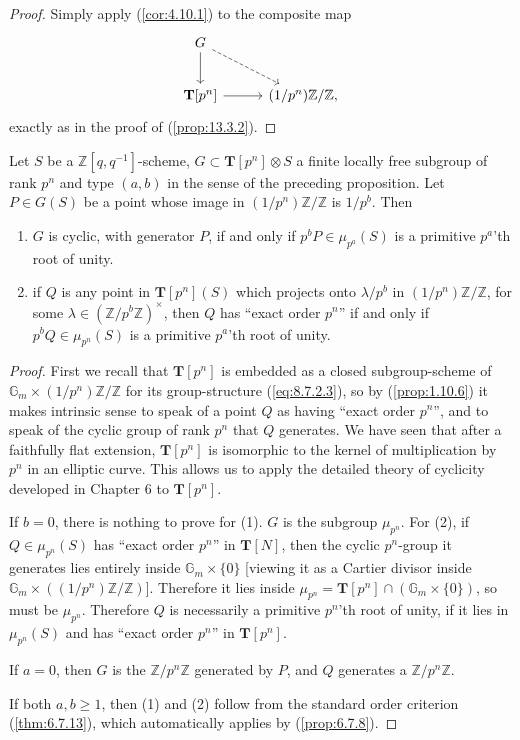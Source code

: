 \begin{proof}
Simply apply (\ref{cor:4.10.1}) to the composite map
\[
\begin{tikzcd}[row sep=2.3em, column sep=2.8em]
G \arrow[d] \arrow[rd, dashed] & \\
\mathbf{T}[p^n] \arrow[r] & (1/p^n)\mathbb{Z}/\mathbb{Z} ,
\end{tikzcd}
\]
exactly as in the proof of (\ref{prop:13.3.2}).
\end{proof}

\begin{kprop}\label{prop:13.6.3}
Let $S$ be a $\mathbb{Z}[q,q^{-1}]$-scheme, $G \subset \mathbf{T}[p^n] \otimes S$ a finite locally free subgroup of rank $p^n$ and type $(a,b)$ in the sense of the preceding proposition. Let $P \in G(S)$ be a point whose image in $(1/p^n)\mathbb{Z}/\mathbb{Z}$ is $1/p^b$. Then
\begin{enumerate}[label=(\arabic*), leftmargin=2.4em]
\item $G$ is cyclic, with generator $P$, if and only if $p^b P \in \mu_{p^a}(S)$ is a primitive $p^a$'th root of unity.
\item if $Q$ is any point in $\mathbf{T}[p^n](S)$ which projects onto $\lambda/p^b$ in $(1/p^n)\mathbb{Z}/\mathbb{Z}$, for some $\lambda \in (\mathbb{Z}/p^b\mathbb{Z})^\times$, then $Q$ has ``exact order $p^n$'' if and only if $p^b Q \in \mu_{p^n}(S)$ is a primitive $p^a$'th root of unity.
\end{enumerate}
\end{kprop}

\begin{proof}
First we recall that $\mathbf{T}[p^n]$ is embedded as a closed subgroup-scheme of $\mathbb{G}_m \times (1/p^n)\mathbb{Z}/\mathbb{Z}$ for its group-structure (\ref{eq:8.7.2.3}), so by (\ref{prop:1.10.6}) it makes intrinsic sense to speak of a point $Q$ as having ``exact order $p^n$'', and to speak of the cyclic group of rank $p^n$ that $Q$ generates. We have seen that after a faithfully flat extension, $\mathbf{T}[p^n]$ is isomorphic to the kernel of multiplication by $p^n$ in an elliptic curve. This allows us to apply the detailed theory of cyclicity developed in Chapter 6 to $\mathbf{T}[p^n]$.

If $b = 0$, there is nothing to prove for (1). $G$ is the subgroup $\mu_{p^n}$. For (2), if $Q \in \mu_{p^n}(S)$ has ``exact order $p^n$'' in $\mathbf{T}[N]$, then the cyclic $p^n$-group it generates lies entirely inside $\mathbb{G}_m \times \{0\}$ [viewing it as a Cartier divisor inside $\mathbb{G}_m \times ((1/p^n)\mathbb{Z}/\mathbb{Z})$]. Therefore it lies inside $\mu_{p^n} = \mathbf{T}[p^n] \cap (\mathbb{G}_m \times \{0\})$, so must be $\mu_{p^n}$. Therefore $Q$ is necessarily a primitive $p^n$'th root of unity, if it lies in $\mu_{p^n}(S)$ and has ``exact order $p^n$'' in $\mathbf{T}[p^n]$.

If $a = 0$, then $G$ is the $\mathbb{Z}/p^n\mathbb{Z}$ generated by $P$, and $Q$ generates a $\mathbb{Z}/p^n\mathbb{Z}$.

If both $a, b \ge 1$, then (1) and (2) follow from the standard order criterion (\ref{thm:6.7.13}), which automatically applies by (\ref{prop:6.7.8}).
\end{proof}

